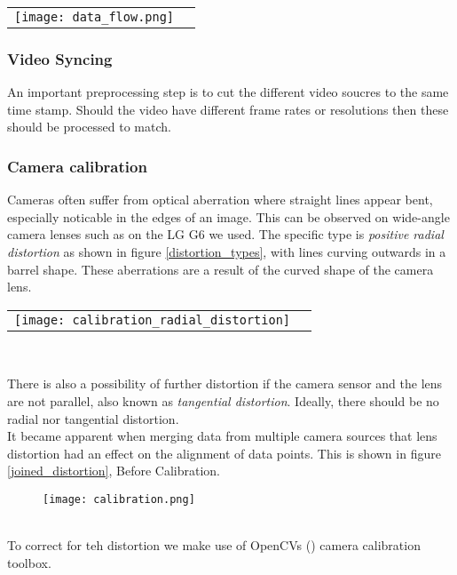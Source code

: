 \color{red}
\raggedbottom
\begin{tabular}{@{}cc}
\texttt{[image: data\_flow.png]} 
\end{tabular}
\label{data}
\raggedbottom
\color{black}

\subsubsection{Video Syncing}
An important preprocessing step is to cut the different video soucres to the same time stamp.
Should the video have different frame rates or resolutions then these should be processed to match.

\subsubsection{Camera calibration}
Cameras often suffer from optical aberration where straight lines appear bent, especially noticable in the edges of an image. 
This can be observed on wide-angle camera lenses such as on the LG G6 we used.
The specific type is \textit{positive radial distortion} as shown in figure \ref{distortion_types}, with lines curving outwards in a barrel shape.
These aberrations are a result of the curved shape of the camera lens.
\ \\ 

\raggedbottom
\begin{tabular}{@{}cc}
\texttt{[image: calibration\_radial\_distortion]} 
\end{tabular}
\label{distortion_types}
\

There is also a possibility of further distortion if the camera sensor and the lens are not parallel, also known as \textit{tangential distortion}.
Ideally, there should be no radial nor tangential distortion.
\ \\
It became apparent when merging data from multiple camera sources that lens distortion had an effect on the alignment of data points.
This is shown in figure \ref{joined_distortion}, Before Calibration.

\begin{figure}[h]
  \texttt{[image: calibration.png]}
  \centering 
  \end{figure}
  \label{joined_distortion}
\ \\

To correct for teh distortion we make use of OpenCVs (\cite{noauthor_opencv/opencv_2021}) camera calibration toolbox.

